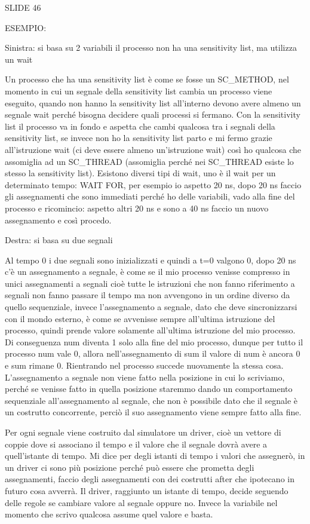 \documentclass[10pt,a4paper,titlepage]{article}
\begin{document}
SLIDE 46

ESEMPIO: 

Sinistra: si basa su 2 variabili 
	   il processo non ha una sensitivity list, ma utilizza un wait 

Un processo che ha una sensitivity list è come se fosse un SC\_METHOD, nel momento in cui un segnale della sensitivity list cambia un processo viene eseguito, quando non hanno la sensitivity list all’interno devono avere almeno un segnale wait perché bisogna decidere quali processi si fermano. 
Con la sensitivity list il processo va in fondo e aspetta che cambi qualcosa tra i segnali della sensitivity list, se invece non ho la sensitivity list parto e mi fermo grazie all’istruzione wait (ci deve essere almeno un’istruzione wait) così ho qualcosa che assomiglia ad un SC_THREAD (assomiglia perché nei SC_THREAD esiste lo stesso la sensitivity list).
Esistono diversi tipi di wait, uno è il wait per un determinato tempo: WAIT FOR, per esempio io aspetto 20 ns,  dopo 20 ns faccio gli assegnamenti che sono immediati perché ho delle variabili, vado alla fine del processo e ricomincio: aspetto altri 20 ns e sono a 40 ns faccio un nuovo assegnamento e così procedo.

Destra: si basa su due segnali

Al tempo 0 i due segnali sono inizializzati e quindi a t=0 valgono 0, dopo 20 ns c’è un assegnamento a segnale, è come se il mio processo venisse compresso in unici assegnamenti a segnali cioè tutte le istruzioni che non fanno riferimento a segnali non fanno passare il tempo ma non avvengono in un ordine diverso da quello sequenziale, invece l’assegnamento a segnale, dato che deve sincronizzarsi con il mondo esterno, è come se avvenisse sempre all’ultima istruzione del processo, quindi prende valore solamente all’ultima istruzione del mio processo. Di conseguenza num diventa 1 solo alla fine del mio processo, dunque per tutto il processo num vale 0, allora nell’assegnamento di sum il valore di num è ancora 0 e sum rimane 0. Rientrando nel processo succede nuovamente la stessa cosa. 
L’assegnamento a segnale non viene fatto nella posizione in cui lo scriviamo, perché se venisse fatto in quella posizione staremmo dando un comportamento sequenziale all’assegnamento al segnale, che non è possibile dato che il segnale è un costrutto concorrente, perciò il suo assegnamento viene sempre fatto alla fine.

Per ogni segnale viene costruito dal simulatore un driver, cioè un vettore di coppie dove si associano il tempo e il valore che il segnale dovrà avere a quell’istante di tempo. Mi dice per degli istanti di tempo i valori che assegnerò, in un driver ci sono più posizione perché può essere che prometta degli assegnamenti, faccio degli assegnamenti con dei costrutti after che ipotecano in futuro cosa avverrà. Il driver, raggiunto un istante di tempo, decide seguendo delle regole se cambiare valore al segnale oppure no. Invece la variabile nel momento che scrivo qualcosa assume quel valore e basta.
\end{document}
